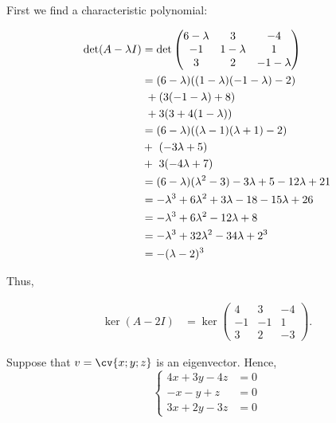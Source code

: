 \documentclass[11pt]{scrartcl}
\begin{document}
\begin{soln}
  \hfill

First we find a characteristic polynomial:

\begin{align}
\det(A-\lambda I) &= \det 
  \begin{pmatrix}
    6-\lambda & 3 & -4\\
    -1 & 1-\lambda & 1\\
    3 & 2 & -1 - \lambda
  \end{pmatrix}\\
&= 
(6-\lambda)((1-\lambda)(-1-\lambda)-2)\\
&\ + (3(-1 - \lambda) +8)\\
&\ + 3(3+4(1-\lambda))\\
&= (6-\lambda)((\lambda-1)(\lambda+1)-2)\\
&+ \ (-3\lambda+5)\\
&+ \ 3(-4\lambda+7)\\
&= (6-\lambda)(\lambda^2-3) -3\lambda+5-12\lambda+21\\
&=-\lambda^3 +6\lambda^2+3\lambda-18-15\lambda+26\\
&=-\lambda^3 +6\lambda^2 - 12\lambda+8\\
&=-\lambda^3+3\*2\lambda^{2}-3\*4\lambda+2^3\\
&=-(\lambda-2)^3
\end{align}

Thus, 

\begin{align}
\ker(A-2I) &=
             \ker\begin{pmatrix}
               4 & 3 & -4\\
               -1 & -1 & 1\\
               3 & 2 & -3
             \end{pmatrix}.
\end{align}

Suppose that $v=\cv{x;y;z}$ is an eigenvector. Hence, 
\begin{equation*}
  \begin{cases}
    4x+3y-4z &= 0\\
    -x-y+z &= 0\\
    3x+2y-3z &= 0
  \end{cases}
\end{equation*}


\end{soln}
\end{document}
